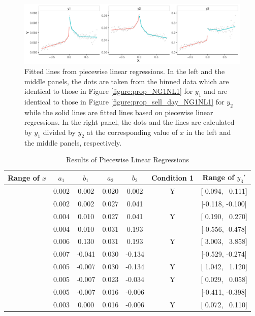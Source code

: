 \documentclass[11pt, a4paper]{article}
\begin{document}
\begin{figure}[H]
	\centering
	\hspace*{-2cm} 
	\includegraphics[width=1.2\columnwidth]{segment.pdf}
	\caption{\small Fitted lines from piecewise linear regressions. In the left and the middle panels, the dots are taken from the binned data which are identical to those in Figure \ref{figure:prop_NG1NL1} for $y_1$ and are identical to those in Figure \ref{figure:prop_sell_day_NG1NL1} for $y_2$ while the solid lines are fitted lines based on piecewise linear regressions. In the right panel, the dots and the lines are calculated by $y_1$ divided by $y_2$ at the corresponding value of $x$ in the left and the middle panels, respectively.}
	\label{figure:segment}
\end{figure}

\begin{table}[ht] %
	\centering
	\caption{Results of Piecewise Linear Regressions}
	\label{table:segment}
	\begin{tabular}{ccccccc}
		\hline
		Range of $x$ & $a_1$ & $b_1$ & $a_2$ & $b_2$ & Condition 1 & Range of $y_3'$ \\ 
		\hline
		[-0.800, -0.171] & 0.002 &  0.002 & 0.020 &  0.002 & Y & [ 0.094, ~0.111] \\ \relax
		[-0.171, -0.130] & 0.002 &  0.002 & 0.027 &  0.041 &   & [-0.118, -0.100] \\ \relax
		[-0.130, -0.030] & 0.004 &  0.010 & 0.027 &  0.041 & Y & [ 0.190, ~0.270] \\ \relax
		[-0.030, -0.019] & 0.004 &  0.010 & 0.031 &  0.193 &   & [-0.556, -0.478] \\ \relax
		[-0.019, ~0.000] & 0.006 &  0.130 & 0.031 &  0.193 & Y & [ 3.003, ~3.858] \\ \relax
		[ 0.000, ~0.063] & 0.007 & -0.041 & 0.030 & -0.134 &   & [-0.529, -0.274] \\ \relax
		[ 0.063, ~0.069] & 0.005 & -0.007 & 0.030 & -0.134 & Y & [ 1.042, ~1.120] \\ \relax
		[ 0.069, ~0.248] & 0.005 & -0.007 & 0.023 & -0.034 & Y & [ 0.029, ~0.058] \\ \relax
		[ 0.248, ~0.291] & 0.005 & -0.007 & 0.016 & -0.006 &   & [-0.411, -0.398] \\ \relax
		[ 0.291, ~0.800] & 0.003 &  0.000 & 0.016 & -0.006 & Y & [ 0.072, ~0.110] \\ 
		\hline
	\end{tabular}
\end{table}
\end{document}
